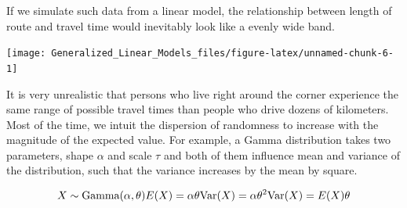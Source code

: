 \documentclass[]{svmono}
\newenvironment{Shaded}{\begin{snugshade}}{\end{snugshade}}
\newcommand{\KeywordTok}[1]{\textcolor[rgb]{0.13,0.29,0.53}{\textbf{#1}}}
\newcommand{\DataTypeTok}[1]{\textcolor[rgb]{0.13,0.29,0.53}{#1}}
\newcommand{\DecValTok}[1]{\textcolor[rgb]{0.00,0.00,0.81}{#1}}
\newcommand{\StringTok}[1]{\textcolor[rgb]{0.31,0.60,0.02}{#1}}
\newcommand{\OperatorTok}[1]{\textcolor[rgb]{0.81,0.36,0.00}{\textbf{#1}}}
\newcommand{\NormalTok}[1]{#1}
\begin{document}
If we simulate such data from a linear model, the relationship between
length of route and travel time would inevitably look like a evenly wide
band.

\begin{Shaded}
\end{Shaded}

\texttt{[image: Generalized\_Linear\_Models\_files/figure-latex/unnamed-chunk-6-1]}

It is very unrealistic that persons who live right around the corner
experience the same range of possible travel times than people who drive
dozens of kilometers. Most of the time, we intuit the dispersion of
randomness to increase with the magnitude of the expected value. For
example, a Gamma distribution takes two parameters, shape \(\alpha\) and
scale \(\tau\) and both of them influence mean and variance of the
distribution, such that the variance increases by the mean by square.

\[
X \sim \textrm{Gamma}(\alpha, \theta)\\
E(X) = \alpha \theta\\
\textrm{Var}(X) = \alpha \theta^2\\
\textrm{Var}(X) = E(X) \theta
\]
\end{document}
